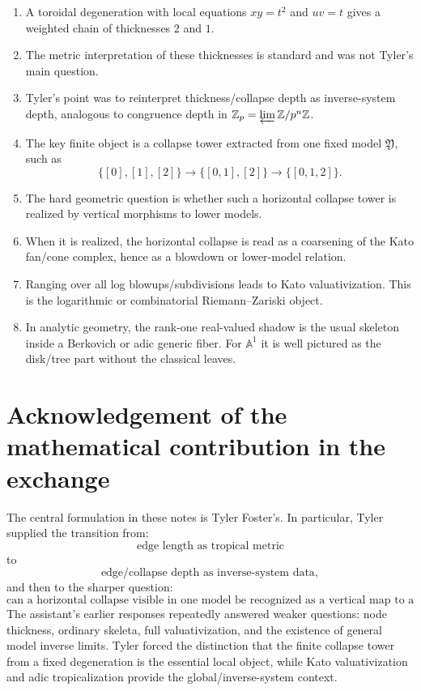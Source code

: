 \documentclass[11pt]{article}
\newcommand{\A}{\mathbb A}
\newcommand{\Z}{\mathbb Z}
\newcommand{\mfY}{\mathfrak Y}
\begin{document}
\begin{enumerate}[leftmargin=2em]
\item A toroidal degeneration with local equations $xy=t^2$ and $uv=t$ gives a weighted chain of thicknesses $2$ and $1$.
\item The metric interpretation of these thicknesses is standard and was not Tyler's main question.
\item Tyler's point was to reinterpret thickness/collapse depth as inverse-system depth, analogous to congruence depth in $\Z_p=\varprojlim\Z/p^n\Z$.
\item The key finite object is a collapse tower extracted from one fixed model $\mfY$, such as
\[
\{[0],[1],[2]\}\to\{[0,1],[2]\}\to\{[0,1,2]\}.
\]
\item The hard geometric question is whether such a horizontal collapse tower is realized by vertical morphisms to lower models.
\item When it is realized, the horizontal collapse is read as a coarsening of the Kato fan/cone complex, hence as a blowdown or lower-model relation.
\item Ranging over all log blowups/subdivisions leads to Kato valuativization. This is the logarithmic or combinatorial Riemann--Zariski object.
\item In analytic geometry, the rank-one real-valued shadow is the usual skeleton inside a Berkovich or adic generic fiber. For $\A^1$ it is well pictured as the disk/tree part without the classical leaves.
\end{enumerate}

\section*{Acknowledgement of the mathematical contribution in the exchange}

The central formulation in these notes is Tyler Foster's. In particular, Tyler supplied the transition from:
\[
\text{edge length as tropical metric}
\]
to
\[
\text{edge/collapse depth as inverse-system data},
\]
and then to the sharper question:
\[
\text{can a horizontal collapse visible in one model be recognized as a vertical map to a lower model?}
\]
The assistant's earlier responses repeatedly answered weaker questions: node thickness, ordinary skeleta, full valuativization, and the existence of general model inverse limits. Tyler forced the distinction that the finite collapse tower from a fixed degeneration is the essential local object, while Kato valuativization and adic tropicalization provide the global/inverse-system context.

\nocite{UlirschFunctorialTropicalization,UlirschArtinFans,AbramovichCaporasoPayne,AbramovichChenMarcusUlirschWise,TalpoVistoliInfiniteRootStacks}
\printbibliography
\end{document}
